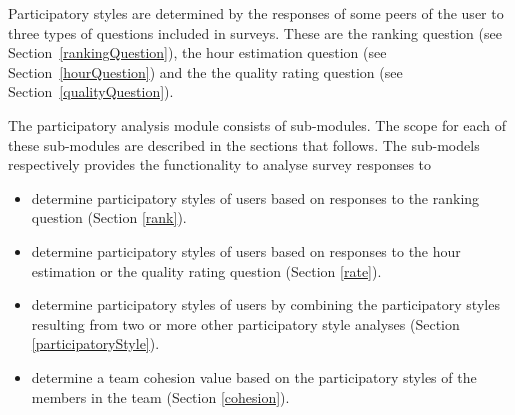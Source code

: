 Participatory styles are determined by the responses of some peers of the user to three types of questions included in surveys. These are the ranking question (see Section~\ref{rankingQuestion}), the hour estimation question  (see Section~\ref{hourQuestion}) and the the quality rating question  (see Section~\ref{qualityQuestion}). 

The participatory analysis module consists of sub-modules. The scope for each of these sub-modules are described in the sections that follows.  The sub-models respectively provides the functionality to analyse survey responses to
\begin{itemize}
\item determine participatory styles of users based on responses to the ranking question (Section \ref{rank}).
\item determine participatory styles of users based on responses to the hour estimation or the quality rating question (Section \ref{rate}).
\item determine participatory styles of users by combining the participatory styles resulting from two or more other participatory style analyses (Section \ref{participatoryStyle}).
\item determine a team cohesion value based on the participatory styles of the members in the team (Section \ref{cohesion}).
\end{itemize} 